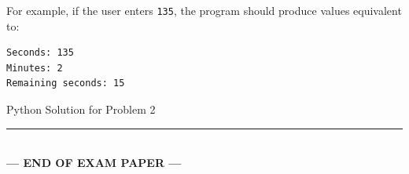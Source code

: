 \documentclass[11pt,a4paper]{article}
\begin{document}
For example, if the user enters \texttt{135}, the program should produce values equivalent to:
\begin{lstlisting}
Seconds: 135
Minutes: 2
Remaining seconds: 15
\end{lstlisting}

\begin{answerbox}[height=15.4cm]{Python Solution for Problem 2}
\end{answerbox}

\vfill
\begin{center}
  \rule{0.5\textwidth}{0.4pt}\\[1mm]
  \textbf{\color{primaryblue}--- END OF EXAM PAPER ---}
\end{center}
\end{document}
